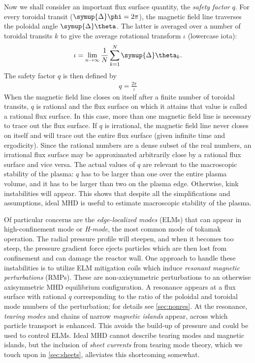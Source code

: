 Now we shall consider an important flux surface quantity, the \emph{safety factor} $q$. For every toroidal transit ($\symup{\Delta} \phi = 2 \pi$), the magnetic field line traverses the poloidal angle $\symup{\Delta} \theta$. The latter is averaged over a number of toroidal transits $k$ to give the average rotational transform $\iota$ (lowercase iota):
\begin{gather}
  \iota = \lim_{n \to \infty} \frac{1}{N} \sum_{k = 1}^{N} \symup{\Delta} \theta_{k}.
\end{gather}
The safety factor $q$ is then defined by
\begin{gather}
  q = \frac{2 \pi}{\iota}
\end{gather}
When the magnetic field line closes on itself after a finite number of toroidal transits, $q$ is rational and the flux surface on which it attains that value is called a rational flux surface. In this case, more than one magnetic field line is necessary to trace out the flux surface. If $q$ is irrational, the magnetic field line never closes on itself and will trace out the entire flux surface (given infinite time and ergodicity). Since the rational numbers are a dense subset of the real numbers, an irrational flux surface may be approximated arbitrarily close by a rational flux surface and vice versa. The actual values of $q$ are relevant to the macroscopic stability of the plasma: $q$ has to be larger than one over the entire plasma volume, and it has to be larger than two on the plasma edge. Otherwise, kink instabilities will appear. This shows that despite all the simplifications and assumptions, ideal MHD is useful to estimate macroscopic stability of the plasma.

Of particular concerns are the \emph{edge-localized modes} (ELMs) that can appear in high-confinement mode or \emph{H-mode}, the most common mode of tokamak operation. The radial pressure profile will steepen, and when it becomes too steep, the pressure gradient force ejects particles which are then lost from confinement and can damage the reactor wall. One approach to handle these instabilities is to utilize ELM mitigation coils which induce \emph{resonant magnetic perturbations} (RMPs). These are non-axisymmetric perturbations to an otherwise axisymmetric MHD equilibrium configuration. A resonance appears at a flux surface with rational $q$ corresponding to the ratio of the poloidal and toroidal mode numbers of the perturbation; for details see \cref{sec:nonres}. At the resonance, \emph{tearing modes} and chains of narrow \emph{magnetic islands} appear, across which particle transport is enhanced. This avoids the build-up of pressure and could be used to control ELMs. Ideal MHD cannot describe tearing modes and magnetic islands, but the inclusion of \emph{sheet currents} from tearing mode theory, which we touch upon in \cref{sec:sheets}, alleviates this shortcoming somewhat.

